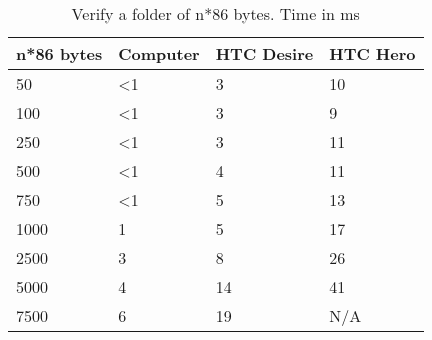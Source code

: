 \begin{table}
  \centering
  \caption{Verify a folder of n*86 bytes. Time in ms}
  \begin{tabular}{ | l | l | l | l |}
    \hline
    \textbf{n*86 bytes} & \textbf{Computer} & \textbf{HTC Desire} & \textbf{HTC Hero} \\ \hline
    50      & <1    &3  & 10    \\ \hline
    100     & <1    &3  &  9    \\ \hline
    250     & <1    &3  & 11    \\ \hline   
    500     & <1    &4  & 11    \\ \hline
    750     & <1    &5  & 13    \\ \hline
    1000    &  1    &5  & 17    \\ \hline
    2500    &  3    &8  & 26    \\ \hline     
    5000    &  4    &14 & 41    \\ \hline 
    7500    &  6    &19 & N/A   \\ \hline 
  \end{tabular}
  \label{tbl:folder:verify}
\end{table}
